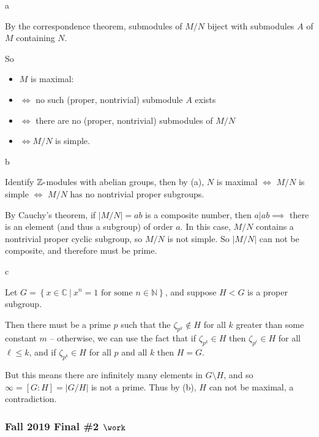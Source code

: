 \begin{solution}

a

By the correspondence theorem, submodules of \(M/N\) biject with
submodules \(A\) of \(M\) containing \(N\).

So

\begin{itemize}
\item
  \(M\) is maximal:
\item
  \(\iff\) no such (proper, nontrivial) submodule \(A\) exists
\item
  \(\iff\) there are no (proper, nontrivial) submodules of \(M/N\)
\item
  \(\iff M/N\) is simple.
\end{itemize}

b

Identify \({\mathbb{Z}}{\hbox{-}}\)modules with abelian groups, then by
(a), \(N\) is maximal \(\iff\) \(M/N\) is simple \(\iff\) \(M/N\) has no
nontrivial proper subgroups.

By Cauchy's theorem, if \({\left\lvert {M/N} \right\rvert} = ab\) is a
composite number, then \(a\mathrel{\Big|}ab \implies\) there is an
element (and thus a subgroup) of order \(a\). In this case, \(M/N\)
contains a nontrivial proper cyclic subgroup, so \(M/N\) is not simple.
So \({\left\lvert {M/N} \right\rvert}\) can not be composite, and
therefore must be prime.

c

Let
\(G = \left\{{x \in {\mathbb{C}}{~\mathrel{\Big|}~}x^n=1 \text{ for some }n\in {\mathbb{N}}}\right\}\),
and suppose \(H < G\) is a proper subgroup.

Then there must be a prime \(p\) such that the
\(\zeta_{p^k} \not \in H\) for all \(k\) greater than some constant
\(m\) -- otherwise, we can use the fact that if \(\zeta_{p^k} \in H\)
then \(\zeta_{p^\ell} \in H\) for all \(\ell \leq k\), and if
\(\zeta_{p^k} \in H\) for all \(p\) and all \(k\) then \(H = G\).

But this means there are infinitely many elements in \(G\setminus H\),
and so \(\infty = [G: H] = {\left\lvert {G/H} \right\rvert}\) is not a
prime. Thus by (b), \(H\) can not be maximal, a contradiction.

\end{solution}

\hypertarget{fall-2019-final-2-work}{%
\subsubsection{\texorpdfstring{Fall 2019 Final \#2
\(\work\)}{Fall 2019 Final \#2 \textbackslash work}}\label{fall-2019-final-2-work}}

